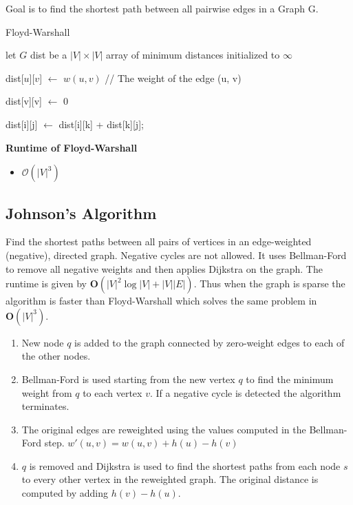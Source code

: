 \documentclass[10pt,landscape,a4paper, table]{extarticle}
\begin{document}
\begin{multicols*}{3}
Goal is to find the shortest path between all pairwise edges in a Graph G.

{\scriptsize
\begin{algorithm}[H]
    \caption{Floyd-Warshall}
    \label{FWAlgorithm}
    \SetAlgoLined
    
    
    let $G$ dist be a $|V| × |V|$ array of minimum distances initialized to $\infty$
    
    
{
    dist[$u$][$v$] $\leftarrow$ $w(u, v)$  // The weight of the edge (u, v)
}

{
    dist[v][v] $\leftarrow$ 0
}

{
     {
         { 
             { 
                dist[i][j] $\leftarrow$ dist[i][k] + dist[k][j];
                
            }
        }
    }
}
\end{algorithm}}
\textbf{Runtime of Floyd-Warshall}
\begin{itemize}
    \item $\mathcal{O}(|V|^3) $
\end{itemize}


\subsection{Johnson's Algorithm}

Find the shortest paths between all pairs of vertices in an edge-weighted (negative), directed graph. Negative cycles are not allowed. It uses Bellman-Ford to remove all negative weights and then applies Dijkstra on the graph. The runtime is given by $\mathbf{O}(|V|^{2}\log |V|+|V||E|)$. Thus when the graph is sparse the algorithm is faster than Floyd-Warshall which solves the same problem in $\mathbf{O}(|V|
^3)$. 

\begin{enumerate}
    \item New node $q$ is added to the graph connected by zero-weight edges to each of the other nodes. 
    \item Bellman-Ford is used starting from the new vertex $q$ to find the minimum weight from $q$ to each vertex $v$. If a negative cycle is detected the algorithm terminates. 
    \item The original edges are reweighted using the values computed in the Bellman-Ford step. $w'(u,v) = w(u,v) + h(u) - h(v)$
    \item $q$ is removed and Dijkstra is used to find the shortest paths from each node $s$ to every other vertex in the reweighted graph. The original distance is computed by adding $h(v)- h(u)$.
\end{enumerate}


\end{multicols*}
\end{document}
